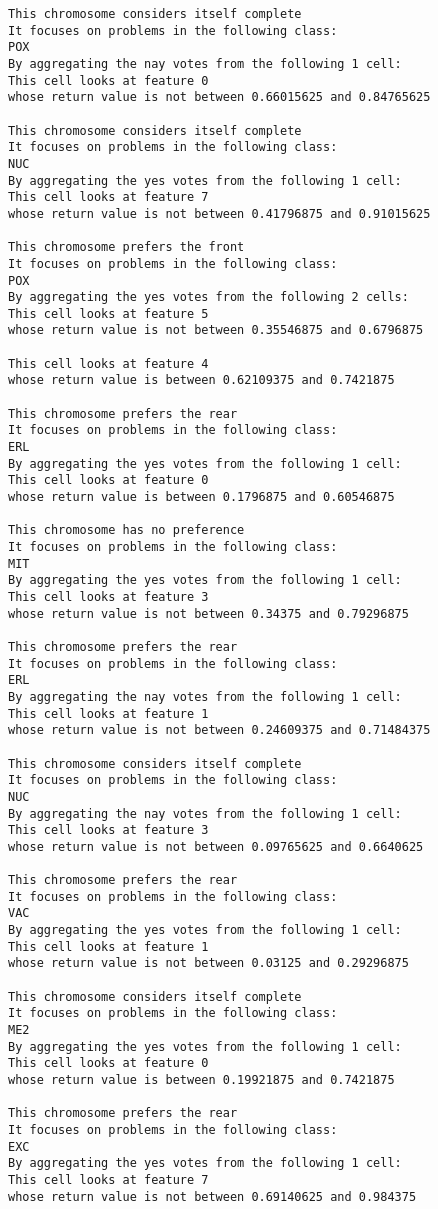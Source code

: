 \begin{lstlisting}[caption={Best Hunter, Yeast}]
This chromosome considers itself complete
It focuses on problems in the following class:
POX
By aggregating the nay votes from the following 1 cell:
This cell looks at feature 0
whose return value is not between 0.66015625 and 0.84765625 

This chromosome considers itself complete
It focuses on problems in the following class:
NUC
By aggregating the yes votes from the following 1 cell:
This cell looks at feature 7
whose return value is not between 0.41796875 and 0.91015625 

This chromosome prefers the front
It focuses on problems in the following class:
POX
By aggregating the yes votes from the following 2 cells:
This cell looks at feature 5
whose return value is not between 0.35546875 and 0.6796875 

This cell looks at feature 4
whose return value is between 0.62109375 and 0.7421875 

This chromosome prefers the rear
It focuses on problems in the following class:
ERL
By aggregating the yes votes from the following 1 cell:
This cell looks at feature 0
whose return value is between 0.1796875 and 0.60546875 

This chromosome has no preference
It focuses on problems in the following class:
MIT
By aggregating the yes votes from the following 1 cell:
This cell looks at feature 3
whose return value is not between 0.34375 and 0.79296875 

This chromosome prefers the rear
It focuses on problems in the following class:
ERL
By aggregating the nay votes from the following 1 cell:
This cell looks at feature 1
whose return value is not between 0.24609375 and 0.71484375 

This chromosome considers itself complete
It focuses on problems in the following class:
NUC
By aggregating the nay votes from the following 1 cell:
This cell looks at feature 3
whose return value is not between 0.09765625 and 0.6640625 

This chromosome prefers the rear
It focuses on problems in the following class:
VAC
By aggregating the yes votes from the following 1 cell:
This cell looks at feature 1
whose return value is not between 0.03125 and 0.29296875 

This chromosome considers itself complete
It focuses on problems in the following class:
ME2
By aggregating the yes votes from the following 1 cell:
This cell looks at feature 0
whose return value is between 0.19921875 and 0.7421875 

This chromosome prefers the rear
It focuses on problems in the following class:
EXC
By aggregating the yes votes from the following 1 cell:
This cell looks at feature 7
whose return value is not between 0.69140625 and 0.984375 


\end{lstlisting}
